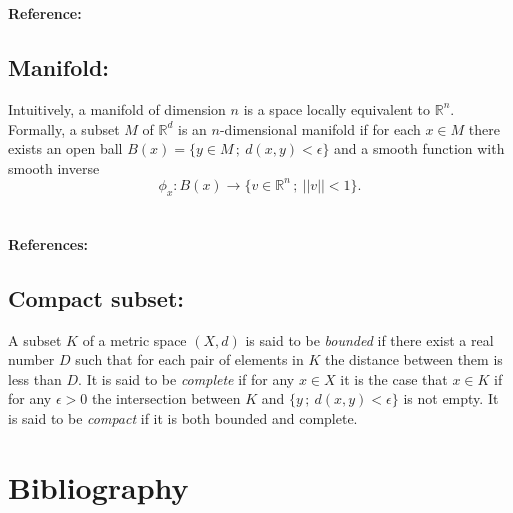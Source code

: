\documentclass{amsart}
\begin{document}
  \paragraph{\\ Reference:} \cite{takens1981detecting}
	
	\subsection*{Manifold:} \label{manifold}
	
	Intuitively, a manifold of dimension $n$ is a space locally equivalent to $\mathbb R^n$. Formally, a subset $M$ of $\mathbb R^d$ is an $n$-dimensional manifold if for each $x \in M$ there exists an open ball $B(x) = \{ y \in M\,;\ d(x,y) < \epsilon\}$ and a smooth function with smooth inverse 
	\begin{equation*}
	\phi_x : B(x) \to \{v \in \mathbb R^n\,;\ ||v||<1\}.
	\end{equation*}
	
	\paragraph{\\ References:}  \cite{milnor1997topology,guillemin2010differential}
	
	\subsection*{Compact subset:}	\label{compact subset}

	A subset $K$ of a metric space $(X,d)$ is said to be \textit{bounded} if there exist a real number $D$ such that for each pair of elements in $K$ the distance between them is less than $D$. It is said to be \textit{complete} if for any $x \in X$ it is the case that $x \in K$ if for any $\epsilon > 0$ the intersection between $K$ and $\{y \,;\ d(x,y) < \epsilon \}$ is not empty. It is said to be \textit{compact} if it is both bounded and complete.

	\section{Bibliography}
	{}
	
\end{document}

